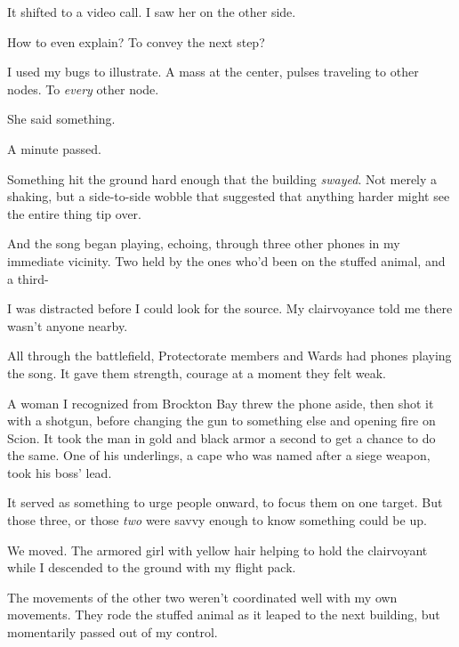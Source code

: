 It shifted to a video call.  I saw her on the other side.



How to even explain?  To convey the next step?



I used my bugs to illustrate.  A mass at the center, pulses traveling to other nodes.  To \emph{every} other node.



She said something.



A minute passed.



Something hit the ground hard enough that the building \emph{swayed}.  Not merely a shaking, but a side-to-side wobble that suggested that anything harder might see the entire thing tip over.



And the song began playing, echoing, through three other phones in my immediate vicinity.  Two held by the ones who'd been on the stuffed animal, and a third-



I was distracted before I could look for the source.  My clairvoyance told me there wasn't anyone nearby.



All through the battlefield, Protectorate members and Wards had phones playing the song.  It gave them strength, courage at a moment they felt weak.



A woman I recognized from Brockton Bay threw the phone aside, then shot it with a shotgun, before changing the gun to something else and opening fire on Scion.  It took the man in gold and black armor a second to get a chance to do the same.  One of his underlings, a cape who was named after a siege weapon, took his boss' lead.



It served as something to urge people onward, to focus them on one target.  But those three, or those \emph{two} were savvy enough to know something could be up.



We moved.  The armored girl with yellow hair helping to hold the clairvoyant while I descended to the ground with my flight pack.



The movements of the other two weren't coordinated well with my own movements.  They rode the stuffed animal as it leaped to the next building, but momentarily passed out of my control.



